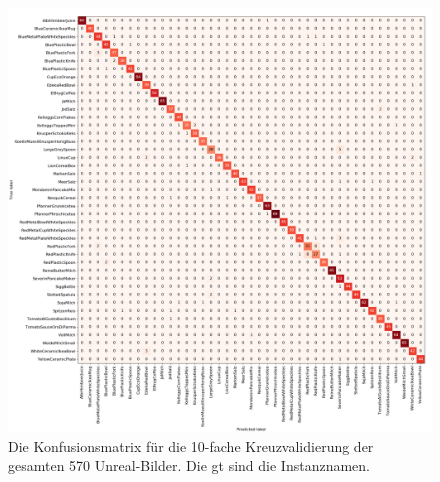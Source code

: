 \begin{figure}
\centering
	\includegraphics[scale=.292]{img/chapter6/UnrealGTInstance.png}
\caption[Konfusionsmatrix des gesamten Unreal-Bilder Datensatzes mit den Instanznamen als GT]{Die Konfusionsmatrix für die 10-fache Kreuzvalidierung der gesamten 570 Unreal-Bilder. Die \gls{gt} sind die Instanznamen.}
\label{fig:UnrealGTInstance_confMatrix}
\end{figure}


